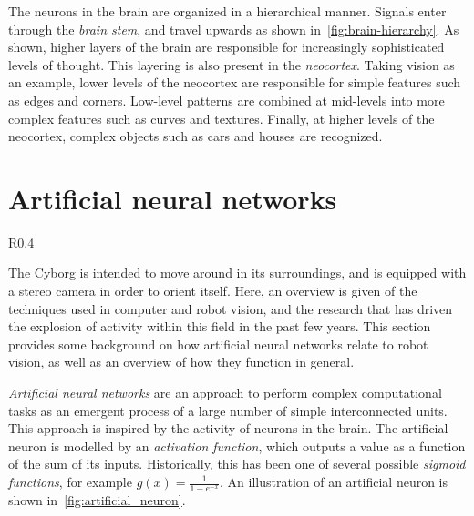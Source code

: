 \documentclass[\rootfolder/main.tex]{subfiles}
\begin{document}
The neurons in the brain are organized in a hierarchical manner.
Signals enter through the \emph{brain stem}, and travel upwards as shown in~\cref{fig:brain-hierarchy}.
As shown, higher layers of the brain are responsible for increasingly sophisticated levels of thought.
This layering is also present in the \emph{neocortex}.
Taking vision as an example, lower levels of the neocortex are responsible for simple features such as edges and corners.
Low-level patterns are combined at mid-levels into more complex features such as curves and textures.
Finally, at higher levels of the neocortex, complex objects such as cars and houses are recognized.


\section{Artificial neural networks}

\begin{wrapfigure}{R}{0.4\columnwidth}
    \caption{Model of an artificial neuron.}
    \label{fig:artificial_neuron}
\end{wrapfigure}

The Cyborg is intended to move around in its surroundings, and is equipped with a stereo camera in order to orient itself.
Here, an overview is given of the techniques used in computer and robot vision, and the research that has driven the explosion of activity within this field in the past few years.
This section provides some background on how artificial neural networks relate to robot vision, as well as an overview of how they function in general.

\emph{Artificial neural networks} are an approach to perform complex computational tasks as an emergent process of a large number of simple interconnected units.
This approach is inspired by the activity of neurons in the brain.
The artificial neuron is modelled by an \emph{activation function}, which outputs a value as a function of the sum of its inputs.
Historically, this has been one of several possible \emph{sigmoid functions}, for example $g\left(x\right) = \frac{1}{1 - e^{-x}}$.
An illustration of an artificial neuron is shown in~\cref{fig:artificial_neuron}.
\end{document}
